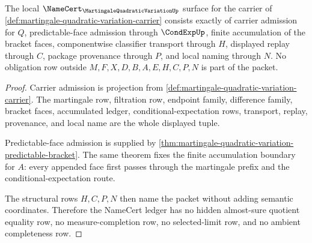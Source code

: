 \begin{theorem}
\label{thm:martingale-quadratic-variation-ledger}
The local $\NameCert_{\MartingaleQuadraticVariationUp}$ surface for the carrier of \autoref{def:martingale-quadratic-variation-carrier} consists exactly of carrier admission for $Q$, predictable-face admission through $\CondExpUp$, finite accumulation of the bracket faces, componentwise classifier transport through $H$, displayed replay through $C$, package provenance through $P$, and local naming through $N$. No obligation row outside $M,F,X,D,B,A,E,H,C,P,N$ is part of the packet.
\end{theorem}
\begin{proof}
Carrier admission is projection from \autoref{def:martingale-quadratic-variation-carrier}. The martingale row, filtration row, endpoint family, difference family, bracket faces, accumulated ledger, conditional-expectation rows, transport, replay, provenance, and local name are the whole displayed tuple.

Predictable-face admission is supplied by \autoref{thm:martingale-quadratic-variation-predictable-bracket}. The same theorem fixes the finite accumulation boundary for $A$: every appended face first passes through the martingale prefix and the conditional-expectation route.

The structural rows $H,C,P,N$ then name the packet without adding semantic coordinates. Therefore the NameCert ledger has no hidden almost-sure quotient equality row, no measure-completion row, no selected-limit row, and no ambient completeness row.
\end{proof}




